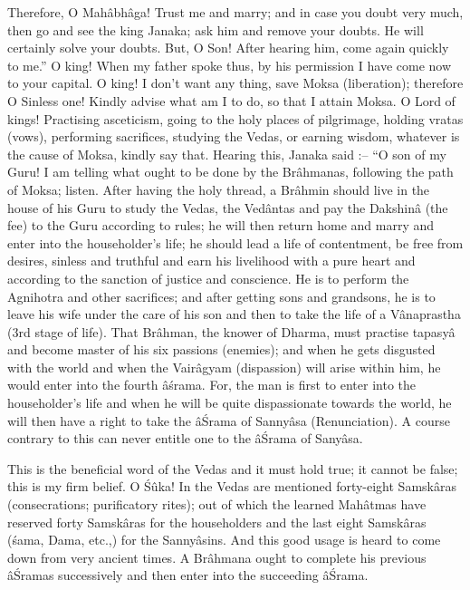 Therefore, O Mah\^abh\^aga! Trust me and marry; and in case you doubt very much, then go and see the king Janaka; ask him and remove your doubts. He will certainly solve your doubts. But, O Son! After hearing him, come again quickly to me.'' O king! When my father spoke thus, by his permission I have come now to your capital. O king! I don't want any thing, save Moksa (liberation); therefore O Sinless one! Kindly advise what am I to do, so that I attain Moksa. O Lord of kings! Practising asceticism, going to the holy places of pilgrimage, holding vratas (vows), performing sacrifices, studying the Vedas, or earning wisdom, whatever is the cause of Moksa, kindly say that. Hearing this, Janaka said :-- ``O son of my Guru! I am telling what ought to be done by the Br\^ahmanas, following the path of Moksa; listen. After having the holy thread, a Br\^ahmin should live in the house of his Guru to study the Vedas, the Ved\^antas and pay the Dakshin\^a (the fee) to the Guru according to rules; he will then return home and marry and enter into the householder's life; he should lead a life of contentment, be free from desires, sinless and truthful and earn his livelihood with a pure heart and according to the sanction of justice and conscience. He is to perform the Agnihotra and other sacrifices; and after getting sons and grandsons, he is to leave his wife under the care of his son and then to take the life of a V\^anaprastha (3rd stage of life). That Br\^ahman, the knower of Dharma, must practise tapasy\^a and become master of his six passions (enemies); and when he gets disgusted with the world and when the Vair\^agyam (dispassion) will arise within him, he would enter into the fourth \^a\'srama. For, the man is first to enter into the householder's life and when he will be quite dispassionate towards the world, he will then have a right to take the \^a\'Srama of Sanny\^asa (Renunciation). A course contrary to this can never entitle one to the \^a\'Srama of Sany\^asa.

This is the beneficial word of the Vedas and it must hold true; it cannot be false; this is my firm belief. O \'S\^uka! In the Vedas are mentioned forty-eight Samsk\^aras (consecrations; purificatory rites); out of which the learned Mah\^atmas have reserved forty Samsk\^aras for the householders and the last eight Samsk\^aras (\'sama, Dama, etc.,) for the Sanny\^asins. And this good usage is heard to come down from very ancient times. A Br\^ahmana ought to complete his previous \^a\'Sramas successively and then enter into the succeeding \^a\'Srama.

